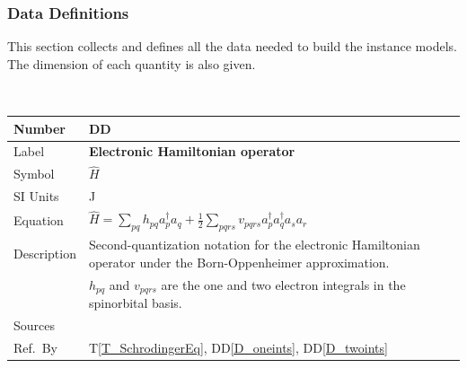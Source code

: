 \documentclass[12pt]{article}
\newcommand{\colAwidth}{0.13\textwidth}
\newcommand{\colBwidth}{0.82\textwidth}
\newcounter{defnum} %
\newcounter{datadefnum} %
\newcommand{\ddref}[1]{DD\ref{#1}}
\newcommand{\tref}[1]{T\ref{#1}}
\begin{document}
\subsubsection{Data Definitions}\label{sec_datadef}

This section collects and defines all the data needed to build the instance
models. The dimension of each quantity is also given.  

~\newline

\noindent
\begin{minipage}{\textwidth}
	\renewcommand*{\arraystretch}{1.5}
	\begin{tabular}{| p{\colAwidth} | p{\colBwidth}|}
		\hline
		\rowcolor[gray]{0.9}
		Number& DD{datadefnum}\thedatadefnum 
		\label{D_hamiltonian}\\
		\hline
		Label& \bf Electronic Hamiltonian operator\\
		\hline
		Symbol & $\hat{H}$\\
		\hline
		SI Units & \si{\joule}\\
		\hline
		Equation&$\hat{H} = \sum_{pq} h_{pq} a^{\dagger}_p a_q + \frac{1}{2} 
		\sum_{pqrs} v_{pqrs} a^{\dagger}_p a^{\dagger}_q a_s a_r$\\
		\hline
		Description & Second-quantization notation for the electronic 
		Hamiltonian operator under the Born-Oppenheimer approximation.
		\\
		&$h_{pq} $ and $ v_{pqrs}$ are the one and two electron integrals in 
		the spinorbital basis.\\
		\hline
		Sources& \cite{szabo-ostlund} \\
		\hline
		Ref.\ By & \tref{T_SchrodingerEq}, \ddref{D_oneints}, 
		\ddref{D_twoints}\\
		\hline
	\end{tabular}
\end{minipage}\\

~\newline
\end{document}
